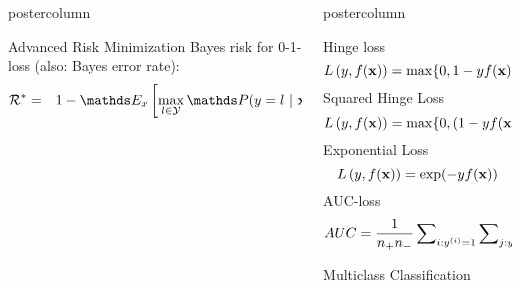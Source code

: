 \documentclass{beamer}
\newlength{\columnheight} %
\begin{document}
\begin{frame}[fragile]{}
\begin{columns}
\begin{column}{.31\textwidth}
\begin{beamercolorbox}[center]{postercolumn}
\begin{minipage}{.98\textwidth}
{\begin{myblock}{Advanced Risk Minimization}
%
Bayes risk for  0-1-loss (also: Bayes error rate):
%
\begin{eqnarray*}  
	\riskbayes &=& 1 - \E_x \left[\max_{l \in \Yspace} \P(y = l~|~ \xv = \xv)\right]
\end{eqnarray*}

\end{myblock}\vfill
				}
			\end{minipage}
		\end{beamercolorbox}
	\end{column}
	\begin{column}{.31\textwidth}
		\begin{beamercolorbox}[center]{postercolumn}
			\begin{minipage}{.98\textwidth}
				\parbox[t][\columnheight]{\textwidth}{
\begin{myblock}{} \vspace{-4ex}

Hinge loss
$$\Lxy = \max \{ 0, 1 - y\fx \}$$
%
Squared Hinge Loss
$$\Lxy = \max \{ 0, (1 - y\fx)^2 \}$$
%
Exponential Loss
$$\Lxy = \exp(-y\fx)$$
%
AUC-loss
%
$$AUC = \frac{1}{n_+ n_-}   \sum\nolimits_{i: \yi = 1} \sum\nolimits_{j: \yi[j] = -1} [f^{(i)} > f^{(j)}]$$
%
\end{myblock} 
%
%
\begin{myblock}{Multiclass Classification}
%	
\begin{small}
\end{small}


\end{myblock}}
\end{minipage}
\end{beamercolorbox}
\end{column}
\end{columns}
\end{frame}
\end{document}
